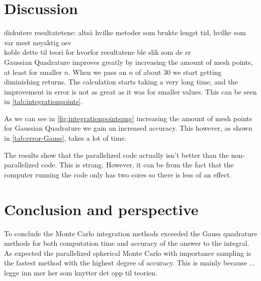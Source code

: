 \documentclass{article}
\begin{document}
\vspace{1cm}

\section{Discussion} \label{sec:Discussion}

diskutere resultatetene: altså hvilke metoder som brukte lengst tid, hvilke som var mest nøyaktig osv \\
koble dette til teori for hvorfor resultatene ble slik som de er \\

Gaussian Quadrature improves greatly by increasing the amount of mesh points, at least for smaller $n$. When we pass an $n$ of about 30 we start getting diminishing returns. The calculation starts taking a very long time, and the improvement in error is not as great as it was for smaller values. This can be seen in \ref{tab:integrationpoints}.

As we can see in \cref{fig:integrationpointspng} increasing the amount of mesh points for Gaussian Quadrature we gain an increased accuracy. This however, as shown in \ref{tab:error-Gauss}, takes a lot of time.


The results show that the parallelized code actually isn't better than the non-parallelized code. This is strang. However, it can be from the fact that the computer running the code only has two cores so there is less of an effect.

\vspace{1cm}

\section{Conclusion and perspective} \label{sec:Conclusion}

To conclude the Monte Carlo integration methods exceeded the Gauss quadrature methods for both computation time and accuracy of the answer to the integral. As expected the parallelized spherical Monte Carlo with importance sampling is the fastest method with the highest degree of accuracy. This is mainly because ... \\

legge inn mer her som knytter det opp til teorien.


\vspace{1cm}
\end{document}
